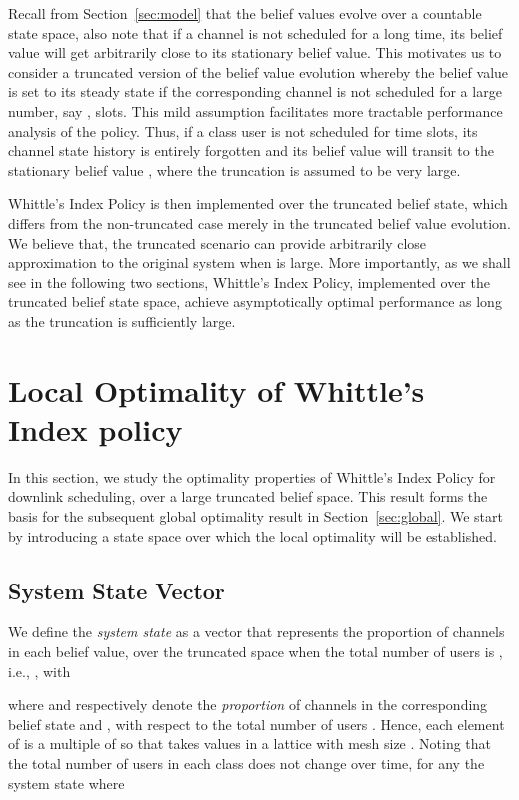 \documentclass[11pt,twocolumn]{IEEEtran}
\begin{document}
Recall from Section~\ref{sec:model} that the belief values evolve over a countable
state space, also note that if a channel is not scheduled for a long time, its
belief value will get arbitrarily close to its stationary belief
value. This motivates us to consider a truncated version of the
belief value evolution whereby the belief value is set to its steady
state if the corresponding channel is not scheduled for a large
number, say , slots. This mild assumption facilitates more
tractable performance analysis of the policy.  Thus,
if a class  user is not scheduled for  time slots, its channel state
history is entirely forgotten and its belief value will transit to
the stationary belief value , where the truncation  is assumed
to be very large.

Whittle's Index Policy is then implemented over the truncated
belief state, which differs from the non-truncated case merely in
the truncated belief value evolution. We believe that, the truncated
scenario can provide arbitrarily close approximation to the original
system when  is large. More importantly, as we shall see in
the following two sections, Whittle's Index Policy, implemented
over the truncated belief state space, achieve asymptotically
optimal performance as long as the truncation is sufficiently large.

\section{Local Optimality of Whittle's Index policy}
\label{sec:local}

In this section, we study the optimality properties of Whittle's
Index Policy for downlink scheduling, over a large truncated belief
space. This result forms the basis for the subsequent global
optimality result in Section~\ref{sec:global}. We start by introducing a state
space over which the local optimality will be established.

\subsection{System State Vector}
\label{sec:local:Z}

We define the \emph{system state}  as a vector
that represents the proportion of channels in each belief value, over
the truncated space when the total number of users is , i.e.,
,
with

where  and  respectively denote the
\emph{proportion} of channels in the corresponding belief state
 and , with respect to the total number of users
. Hence, each element of  is a multiple of 
so that  takes values in a lattice with mesh size
. Noting that the total number of users in each class does not
change over time, for any  the system state  where
\end{document}
